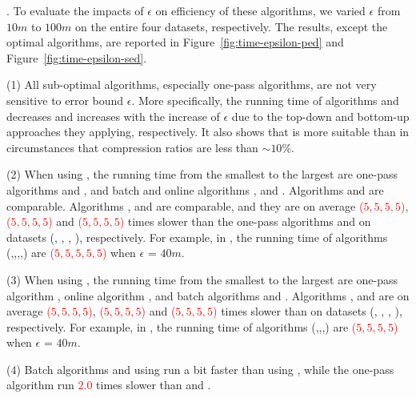 .
To evaluate the impacts of $\epsilon$ on efficiency of these algorithms, we varied $\epsilon$ from $10m$ to $100m$ on the entire four datasets, respectively.
The results, except the optimal algorithms, are reported in Figure~\ref{fig:time-epsilon-ped} and Figure~\ref{fig:time-epsilon-sed}.

\sstab (1) All sub-optimal algorithms, especially one-pass algorithms, are not very sensitive to error bound $\epsilon$. 
More specifically, the running time of algorithms \dpa and \tpa decreases and increases with the increase of $\epsilon$ due to the top-down and bottom-up approaches they applying, respectively. It also shows that \dpa is more suitable than \tpa in circumstances that compression ratios are less than $\sim 10\%$.

\sstab (2) When using \ped, the running time from the smallest to the largest are one-pass algorithms \siped and \operb, and batch and online algorithms \tpa, \dpa and \bqsa. 
Algorithms \siped and \operb are comparable.
Algorithms \tpa, \dpa and \bqsa are comparable, and they are on average \textcolor{red}{($5,5,5,5$)}, \textcolor{red}{($5,5,5,5$)} and \textcolor{red}{($5,5,5,5$)} times slower than the one-pass algorithms \siped and \operb on datasets (\ucar, \geolife, \mopsi, \act), respectively. 
For example, in \mopsi, the running time of algorithms (\tpa,\dpa,\bqsa,\siped,\operb ) are \textcolor{red}{($5, 5,5, 5,5$)} when $\epsilon$ = $40m$.

\sstab (3) When using \sed, the running time from the smallest to the largest are one-pass algorithm \cised, online algorithm \squishe, and batch algorithms \tpa and \dpa. 
Algorithms \squishe, \tpa and \dpa are on average \textcolor{red}{($5,5,5,5$)}, \textcolor{red}{($5,5,5,5$)} and \textcolor{red}{($5,5,5,5$)} times slower than \cised on datasets (\ucar, \geolife, \mopsi, \act), respectively.
For example, in \mopsi, the running time of algorithms (\tpa,\dpa,\squishe,\cised) are \textcolor{red}{($5, 5,5,5$)} when $\epsilon$ = $40m$.

\sstab (4) Batch algorithms \dpa and \tpa using \sed run a bit faster than using \ped, while the one-pass algorithm \cised run \textcolor{red}{$2.0$} times slower than \siped and \operb.


